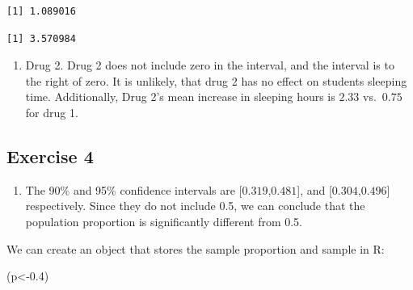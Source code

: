 \documentclass[
  letterpaper,
  DIV=11,
  numbers=noendperiod]{scrreprt}
\newenvironment{Shaded}{\begin{snugshade}}{\end{snugshade}}
\newcommand{\DecValTok}[1]{\textcolor[rgb]{0.68,0.00,0.00}{#1}}
\newcommand{\FloatTok}[1]{\textcolor[rgb]{0.68,0.00,0.00}{#1}}
\newcommand{\FunctionTok}[1]{\textcolor[rgb]{0.28,0.35,0.67}{#1}}
\newcommand{\NormalTok}[1]{\textcolor[rgb]{0.00,0.23,0.31}{#1}}
\newcommand{\OtherTok}[1]{\textcolor[rgb]{0.00,0.23,0.31}{#1}}
\newcommand{\SpecialCharTok}[1]{\textcolor[rgb]{0.37,0.37,0.37}{#1}}
\providecommand{\tightlist}{%
  \setlength{\itemsep}{0pt}\setlength{\parskip}{0pt}}\usepackage{longtable,booktabs,array}
\begin{document}
\begin{verbatim}
[1] 1.089016
\end{verbatim}

\begin{Shaded}
\end{Shaded}

\begin{verbatim}
[1] 3.570984
\end{verbatim}

\begin{enumerate}
\def\labelenumi{\arabic{enumi}.}
\setcounter{enumi}{2}
\tightlist
\item
  Drug 2. Drug 2 does not include zero in the interval, and the interval
  is to the right of zero. It is unlikely, that drug 2 has no effect on
  students sleeping time. Additionally, Drug 2's mean increase in
  sleeping hours is \(2.33\) vs.~\(0.75\) for drug 1.
\end{enumerate}

\hypertarget{exercise-4-13}{%
\subsection*{Exercise 4}\label{exercise-4-13}}

\begin{enumerate}
\def\labelenumi{\arabic{enumi}.}
\tightlist
\item
  The 90\% and 95\% confidence intervals are {[}\(0.319\),\(0.481\){]},
  and {[}\(0.304\),\(0.496\){]} respectively. Since they do not include
  0.5, we can conclude that the population proportion is significantly
  different from 0.5.
\end{enumerate}

We can create an object that stores the sample proportion and sample in
R:

\begin{Shaded}
\begin{Highlighting}[numbers=left,,]
\NormalTok{(p}\OtherTok{\textless{}{-}}\FloatTok{0.4}\NormalTok{)}
\end{Highlighting}
\end{Shaded}
\end{document}

